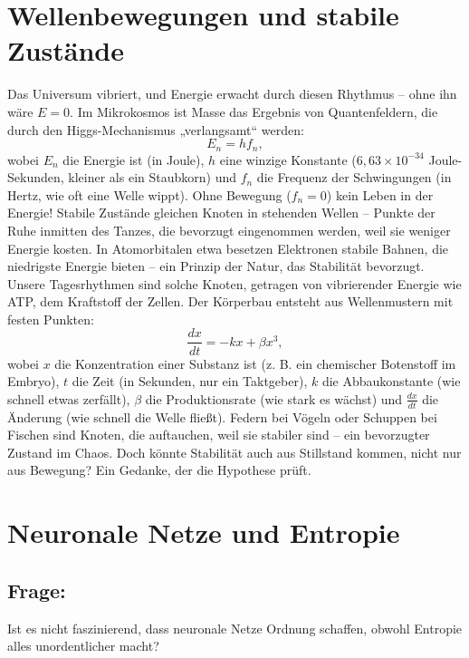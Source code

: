 \documentclass{article}
\begin{document}
	\section{Wellenbewegungen und stabile Zustände}
	Das Universum vibriert, und Energie erwacht durch diesen Rhythmus – ohne ihn wäre $E = 0$. Im Mikrokosmos ist Masse das Ergebnis von Quantenfeldern, die durch den Higgs-Mechanismus „verlangsamt“ werden:
	\begin{equation}
		E_n = h f_n,
	\end{equation}
	wobei $E_n$ die Energie ist (in Joule), $h$ eine winzige Konstante ($6{,}63 \times 10^{-34}$ Joule-Sekunden, kleiner als ein Staubkorn) und $f_n$ die Frequenz der Schwingungen (in Hertz, wie oft eine Welle wippt). Ohne Bewegung ($f_n = 0$) kein Leben in der Energie! Stabile Zustände gleichen Knoten in stehenden Wellen – Punkte der Ruhe inmitten des Tanzes, die bevorzugt eingenommen werden, weil sie weniger Energie kosten. In Atomorbitalen etwa besetzen Elektronen stabile Bahnen, die niedrigste Energie bieten – ein Prinzip der Natur, das Stabilität bevorzugt. Unsere Tagesrhythmen sind solche Knoten, getragen von vibrierender Energie wie ATP, dem Kraftstoff der Zellen. Der Körperbau entsteht aus Wellenmustern mit festen Punkten:
	\begin{equation}
		\frac{dx}{dt} = -kx + \beta x^3,
	\end{equation}
	wobei $x$ die Konzentration einer Substanz ist (z. B. ein chemischer Botenstoff im Embryo), $t$ die Zeit (in Sekunden, nur ein Taktgeber), $k$ die Abbaukonstante (wie schnell etwas zerfällt), $\beta$ die Produktionsrate (wie stark es wächst) und $\frac{dx}{dt}$ die Änderung (wie schnell die Welle fließt). Federn bei Vögeln oder Schuppen bei Fischen sind Knoten, die auftauchen, weil sie stabiler sind – ein bevorzugter Zustand im Chaos. Doch könnte Stabilität auch aus Stillstand kommen, nicht nur aus Bewegung? Ein Gedanke, der die Hypothese prüft.
	
	\section{Neuronale Netze und Entropie}
	
	\subsection*{Frage:}
	Ist es nicht faszinierend, dass neuronale Netze Ordnung schaffen, obwohl Entropie alles unordentlicher macht?
	
\end{document}
